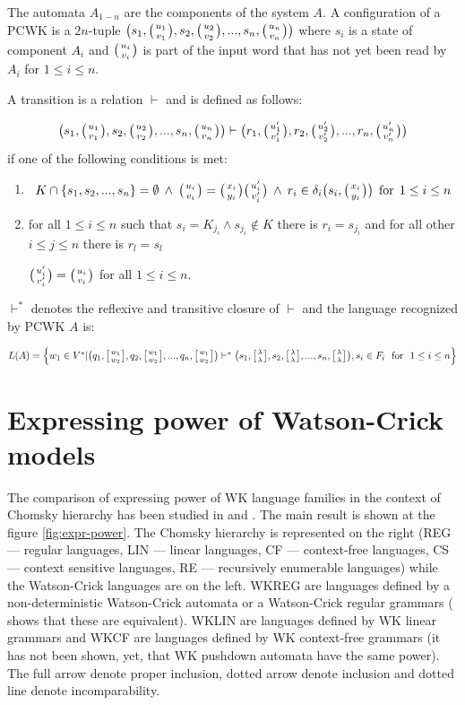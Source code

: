The automata $A_{1-n}$ are the components of the system $A$. A configuration  of a PCWK is a $2n$-tuple $\big(s_1, \wkpair{u_1}{v_1}, s_2, \wkpair{u_2}{v_2}, ..., s_n, \wkpair{u_n}{v_n}\big)$
where $s_i$ is a state of component $A_i$ and $\wkpair{u_i}{v_i}$ is part of the input word that has not yet been read by $A_i$ for $1 \leq i \leq n$.

A transition is a relation $\vdash$ and is defined as follows:

$$\big(s_1, \wkpair{u_1}{v_1}, s_2, \wkpair{u_2}{v_2}, ..., s_n, \wkpair{u_n}{v_n}\big) \vdash \big(r_1, \wkpair{u'_1}{v'_1}, r_2, \wkpair{u'_2}{v'_2}, ..., r_n, \wkpair{u'_n}{v'_n}\big)$$ if one of the following conditions is met:

\begin{enumerate}
  \item{$$K \cap \{s_1, s_2, ..., s_n\} = \emptyset \: \wedge \: \wkpair{u_i}{v_i} = \wkpair{x_i}{y_i}\wkpair{u'_i}{v'_i} \: \wedge \: r_i \in \delta_i\big(s_i, \wkpair{x_i}{y_i}\big)\:\: \textnormal{for} \:\: 1 \leq i \leq n$$}

  \item{for all $1 \leq i \leq n$ such that $s_i = K_{j_i} \wedge s_{j_i} \notin K$ there is $r_i = s_{j_i}$ and for all other $i \leq j \leq n$ there is $r_l = s_l$

  $\wkpair{u'_i}{v'_i} = \wkpair{u_i}{v_i}$ for all $1 \leq i \leq n$.}
\end{enumerate}

$\vdash^*$ denotes the reflexive and transitive closure of $\vdash$ and the language recognized by PCWK $A$ is:

$L(A) = \Big\{w_1 \in V^*| \big(q_1, \wkdomain{w_1}{w_2}, q_2, \wkdomain{w_1}{w_2}, ..., q_n, \wkdomain{w_1}{w_2}\big) \vdash^* \big(s_1, \wkdomain{\lambda}{\lambda}, s_2, \wkdomain{\lambda}{\lambda}, ..., s_n, \wkdomain{\lambda}{\lambda}\big), s_i \in F_i \:\:\: \textnormal{for} \:\:\: 1 \leq i \leq n\Big\}$

\section{Expressing power of Watson-Crick models} \label{section:exp_power}

The comparison of expressing power of WK language families in the context of Chomsky hierarchy has been studied in \cite{WK_GRAMMARS_1} and \cite{WK_GRAMMARS_2}. The main result is shown at the figure \ref{fig:expr-power}. The Chomsky hierarchy is represented on the right (REG --- regular languages, LIN --- linear languages, CF --- context-free languages, CS --- context sensitive languages, RE --- recursively enumerable languages) while the Watson-Crick languages are on the left. WKREG are languages defined by a non-deterministic Watson-Crick automata or a Watson-Crick regular grammars (\cite{REG_GRAMMAR} shows that these are equivalent). WKLIN are languages defined by WK linear grammars and WKCF are languages defined by WK context-free grammars (it has not been shown, yet, that WK pushdown automata have the same power). The full arrow denote proper inclusion, dotted arrow denote inclusion and dotted line denote incomparability.

